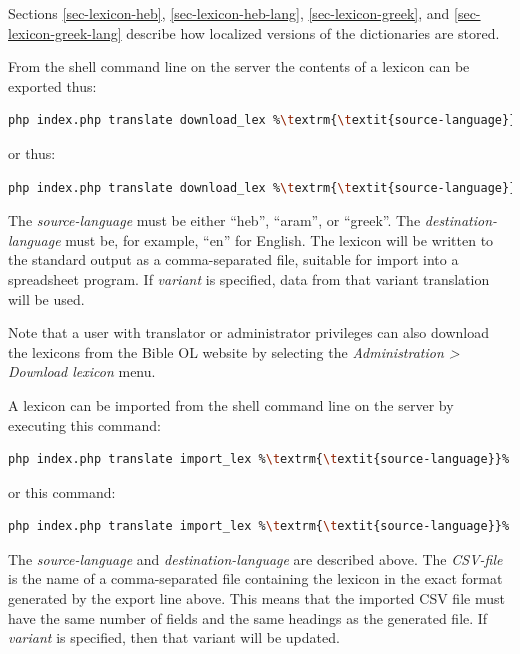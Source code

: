 \documentclass[11pt,oneside,a4paper]{memoir}
\begin{document}
Sections \ref{sec-lexicon-heb}, \ref{sec-lexicon-heb-lang}, \ref{sec-lexicon-greek}, and
\ref{sec-lexicon-greek-lang} describe how localized versions of the dictionaries are stored.

From the shell command line on the server the contents of a lexicon can be exported thus:

\begin{lstlisting}[language=bash,basicstyle={\ttfamily}]
php index.php translate download_lex %\textrm{\textit{source-language}}% %\textrm{\textit{target-language}}%
\end{lstlisting}

\noindent
or thus:

\begin{lstlisting}[language=bash,basicstyle={\ttfamily}]
php index.php translate download_lex %\textrm{\textit{source-language}}% %\textrm{\textit{target-language}}% %\textrm{\textit{variant}}%
\end{lstlisting}

The \emph{source-language} must be either ``heb'', ``aram'', or ``greek''. The
\emph{destination-language} must be, for example, ``en'' for English. The lexicon will be written to
the standard output as a comma-separated file, suitable for import into a spreadsheet program. If \emph{variant} is
specified, data from that variant translation will be used.

Note that a user with translator or administrator privileges can also download the lexicons from the
Bible OL website by selecting the \emph{Administration > Download lexicon} menu.

A lexicon can be imported from the shell command line on the server by executing this command:

\begin{lstlisting}[language=bash,basicstyle={\ttfamily}]
php index.php translate import_lex %\textrm{\textit{source-language}}% %\textrm{\textit{target-language}}% %\textrm{\textit{CSV-file}}%
\end{lstlisting}

\noindent
or this command:

\begin{lstlisting}[language=bash,basicstyle={\ttfamily}]
php index.php translate import_lex %\textrm{\textit{source-language}}% %\textrm{\textit{target-language}}% %\textrm{\textit{CSV-file}}% %\textrm{\textit{variant}}%
\end{lstlisting}


The \emph{source-language} and \emph{destination-language} are described above. The \emph{CSV-file}
is the name of a comma-separated file containing the lexicon in the exact format generated by the export line
above. This means that the imported CSV file must have the same number of fields and the same
headings as the generated file.  If \emph{variant} is
specified, then that variant will be updated.
\end{document}
